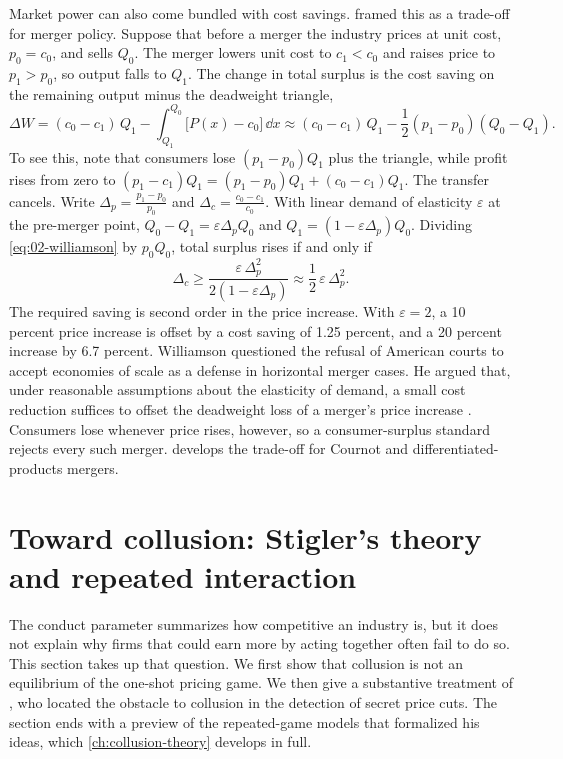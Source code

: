 Market power can also come bundled with cost savings. \citet{Williamson1968} framed this as a trade-off for merger
policy. Suppose that before a merger the industry prices at unit cost, $p_0 = c_0$, and sells $Q_0$. The merger
lowers unit cost to $c_1 < c_0$ and raises price to $p_1 > p_0$, so output falls to $Q_1$. The change in total
surplus is the cost saving on the remaining output minus the deadweight triangle,
\begin{equation}\label{eq:02-williamson}
\Delta W = (c_0 - c_1)\,Q_1 - \int_{Q_1}^{Q_0}\bigl[P(x) - c_0\bigr]\,\dd x
\approx (c_0 - c_1)\,Q_1 - \frac{1}{2}(p_1 - p_0)(Q_0 - Q_1).
\end{equation}
To see this, note that consumers lose $(p_1 - p_0)Q_1$ plus the triangle, while profit rises from zero to
$(p_1 - c_1)Q_1 = (p_1 - p_0)Q_1 + (c_0 - c_1)Q_1$. The transfer cancels. Write $\Delta_p = \frac{p_1 - p_0}{p_0}$
and $\Delta_c = \frac{c_0 - c_1}{c_0}$. With linear demand of elasticity $\varepsilon$ at the pre-merger point,
$Q_0 - Q_1 = \varepsilon\Delta_p Q_0$ and $Q_1 = (1 - \varepsilon\Delta_p)Q_0$. Dividing \eqref{eq:02-williamson} by
$p_0Q_0$, total surplus rises if and only if
\begin{equation}\label{eq:02-williamson-condition}
\Delta_c \ge \frac{\varepsilon\,\Delta_p^2}{2(1 - \varepsilon\Delta_p)} \approx \frac{1}{2}\,\varepsilon\,\Delta_p^2 .
\end{equation}
The required saving is second order in the price increase. With $\varepsilon = 2$, a 10 percent price increase is
offset by a cost saving of 1.25 percent, and a 20 percent increase by 6.7 percent. Williamson questioned the
refusal of American courts to accept economies of scale as a defense in horizontal merger cases. He argued that,
under reasonable assumptions about the elasticity of demand, a small cost reduction suffices to offset the
deadweight loss of a merger's price increase \citep[sec.~1.4]{Tirole1988}.
Consumers lose whenever price rises, however, so a consumer-surplus standard rejects every such merger.
 develops the trade-off for Cournot and differentiated-products mergers.

\section{Toward collusion: Stigler's theory and repeated interaction}\label{sec:02-collusion}

The conduct parameter summarizes how competitive an industry is, but it does not explain why firms that could
earn more by acting together often fail to do so. This section takes up that question. We first show that
collusion is not an equilibrium of the one-shot pricing game. We then give a substantive treatment of
\citet{Stigler1964}, who located the obstacle to collusion in the detection of secret price cuts. The section ends
with a preview of the repeated-game models that formalized his ideas, which \cref{ch:collusion-theory} develops in
full.

